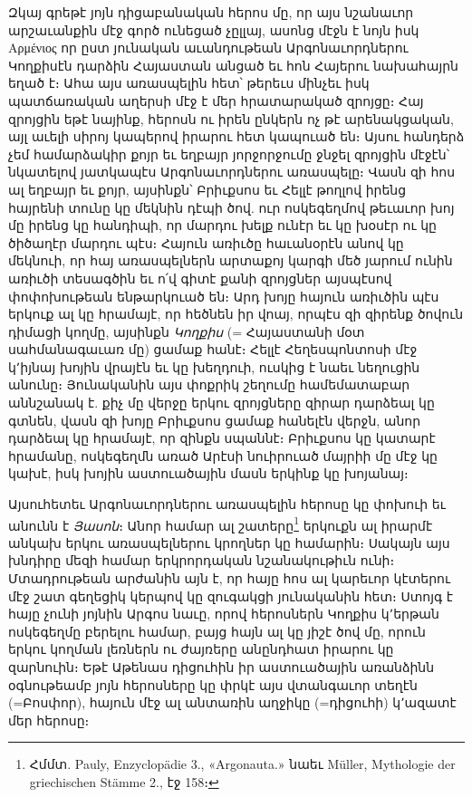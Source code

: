 \documentclass{article}
\begin{document}
{Զկայ գրեթէ յոյն դիցաբանական հերոս մը, որ այս նշանաւոր արշաւանքին մէջ գործ ունեցած չըլլայ, ասոնց մէջն է նոյն իսկ Αρμένιος որ ըստ յունական աւանդութեան Արգոնաւորդներու Կողքիսէն դարձին Հայաստան անցած եւ հոն Հայերու նախահայրն եղած է։ Ահա այս առասպելին հետ՝ թերեւս մինչեւ իսկ պատճառական աղերսի մէջ է մեր հրատարակած զրոյցը։ Հայ զրոյցին եթէ նայինք, հերոսն ու իրեն ընկերն ոչ թէ արենակցական, այլ աւելի սիրոյ կապերով իրարու հետ կապուած են։ Այսու հանդերձ չեմ համարձակիր քոյր եւ եղբայր յորջորջումը ջնջել զրոյցին մէջէն՝ նկատելով յատկապէս Արգոնաւորդներու առասպելը։ Վասն զի հոս ալ եղբայր եւ քոյր, այսինքն՝ Բրիւքսոս եւ Հելլէ թողլով իրենց հայրենի տունը կը մեկնին դէպի ծով. ուր ոսկեգեղմով թեւաւոր խոյ մը իրենց կը հանդիպի, որ մարդու խելք ունէր եւ կը խօսէր ու կը ծիծաղէր մարդու պէս։ Հայուն առիւծը հաւանօրէն անով կը մեկնուի, որ հայ առասպելներն արտաքոյ կարգի մեծ յարում ունին առիւծի տեսագծին եւ ո՛վ գիտէ քանի զրոյցներ այսպէսով փոփոխութեան ենթարկուած են։ Արդ խոյը հայուն առիւծին պէս երկուք ալ կը հրամայէ, որ հեծնեն իր վոայ, որպէս զի զիրենք ծովուն դիմացի կողմը, այսինքն \emph{Կողքիս} (= Հայաստանի մօտ սահմանագաւառ մը) ցամաք հանէ։ Հելլէ Հեղեսպոնտոսի մէջ կ՚իյնայ խոյին վրայէն եւ կը խեղդուի, ուսկից է նաեւ նեղուցին անունը։ Յունականին այս փոքրիկ շեղումը համեմատաբար աննշանակ է. քիչ մը վերջը երկու զրոյցները զիրար դարձեալ կը գտնեն, վասն զի խոյը Բրիւքսոս ցամաք հանելէն վերջն, անոր դարձեալ կը հրամայէ, որ զինքն սպաննէ։ Բրիւքսոս կը կատարէ հրամանը, ոսկեգեղմն առած Արէսի նուիրուած մայրիի մը մէջ կը կախէ, իսկ խոյին աստուածային մասն երկինք կը խոյանայ։

Այսուհետեւ Արգոնաւորդներու առասպելին հերոսը կը փոխուի եւ անունն է \emph{Յասոն}։ Անոր համար ալ շատերը\footnote{Հմմտ. Pauly, Enzyclopädie 3., «Argonauta.» նաեւ Müller, Mythologie der griechischen Stämme 2., էջ 158։} երկուքն ալ իրարմէ անկախ երկու առասպելներու կրողներ կը համարին։ Սակայն այս խնդիրը մեզի համար երկրորդական նշանակութիւն ունի։ Մտադրութեան արժանին այն է, որ հայը հոս ալ կարեւոր կէտերու մէջ շատ գեղեցիկ կերպով կը զուգակցի յունականին հետ։ Ստոյգ է հայը չունի յոյնին Արգոս նաւը, որով հերոսներն Կողքիս կ՚երթան ոսկեգեղմը բերելու համար, բայց հայն ալ կը յիշէ ծով մը, որուն երկու կողման լեռներն ու ժայռերը անընդհատ իրարու կը զարնուին։ Եթէ Աթենաս դիցուհին իր աստուածային առանձինն օգնութեամբ յոյն հերոսները կը փրկէ այս վտանգաւոր տեղէն (=Բոսփոր), հայուն մէջ ալ անտառին աղջիկը (=դիցուհի) կ՚ազատէ մեր հերոսը։

}
\end{document}
